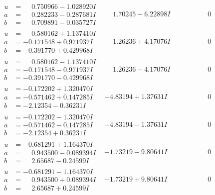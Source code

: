\documentclass[1p]{elsarticle_modified}
\theoremstyle{definition}
\begin{document}
$$\begin{array}{c|c|c}
\begin{aligned}
u &= \phantom{-}0.750966 - 1.028920 I \\
a &= \phantom{-}0.282233 - 0.287681 I \\
b &= \phantom{-}0.709891 - 0.035727 I\end{aligned}
 & \phantom{-}1.70245 - 6.22898 I & \phantom{-0.000000 } 0 \\ \hline\begin{aligned}
u &= \phantom{-}0.580162 + 1.137410 I \\
a &= -0.171548 + 0.971937 I \\
b &= -0.391770 + 0.429968 I\end{aligned}
 & \phantom{-}1.26236 + 4.17076 I & \phantom{-0.000000 } 0 \\ \hline\begin{aligned}
u &= \phantom{-}0.580162 - 1.137410 I \\
a &= -0.171548 - 0.971937 I \\
b &= -0.391770 - 0.429968 I\end{aligned}
 & \phantom{-}1.26236 - 4.17076 I & \phantom{-0.000000 } 0 \\ \hline\begin{aligned}
u &= -0.172202 + 1.320470 I \\
a &= -0.571462 + 0.147285 I \\
b &= -2.12354 - 0.36231 I\end{aligned}
 & -4.83194 + 1.37631 I & \phantom{-0.000000 } 0 \\ \hline\begin{aligned}
u &= -0.172202 - 1.320470 I \\
a &= -0.571462 - 0.147285 I \\
b &= -2.12354 + 0.36231 I\end{aligned}
 & -4.83194 - 1.37631 I & \phantom{-0.000000 } 0 \\ \hline\begin{aligned}
u &= -0.681291 + 1.164370 I \\
a &= \phantom{-}0.943500 - 0.089394 I \\
b &= \phantom{-}2.65687 - 0.24599 I\end{aligned}
 & -1.73219 - 9.80641 I & \phantom{-0.000000 } 0 \\ \hline\begin{aligned}
u &= -0.681291 - 1.164370 I \\
a &= \phantom{-}0.943500 + 0.089394 I \\
b &= \phantom{-}2.65687 + 0.24599 I\end{aligned}
 & -1.73219 + 9.80641 I & \phantom{-0.000000 } 0 \\ \hline\begin{aligned}

\end{aligned}
\end{array}$$
\end{document}

